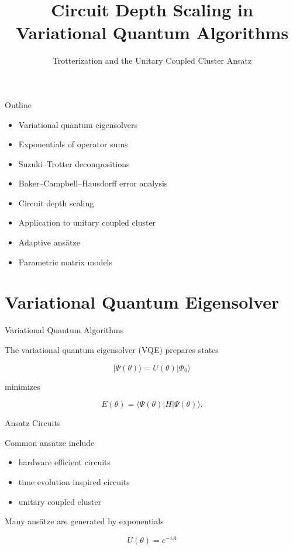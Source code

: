 \documentclass{beamer}
\title{Circuit Depth Scaling in Variational Quantum Algorithms}
\subtitle{Trotterization and the Unitary Coupled Cluster Ansatz}
\author{}
\date{}
\begin{document}
\frame{\titlepage}

\begin{frame}{Outline}

\begin{itemize}
\item Variational quantum eigensolvers
\item Exponentials of operator sums
\item Suzuki–Trotter decompositions
\item Baker–Campbell–Hausdorff error analysis
\item Circuit depth scaling
\item Application to unitary coupled cluster
\item Adaptive ansätze
\item Parametric matrix models
\end{itemize}

\end{frame}

\section{Variational Quantum Eigensolver}

\begin{frame}{Variational Quantum Algorithms}

The variational quantum eigensolver (VQE) prepares states

\[
|\Psi(\theta)\rangle = U(\theta)|\Phi_0\rangle
\]

minimizes

\[
E(\theta)=\langle\Psi(\theta)|H|\Psi(\theta)\rangle .
\]

\end{frame}

\begin{frame}{Ansatz Circuits}

  Common ansätze include

  \begin{itemize}
  \item hardware efficient circuits
  \item time evolution inspired circuits
  \item unitary coupled cluster
  \end{itemize}

  Many ansätze are generated by exponentials

  \[
  U(\theta)=e^{-iA}
  \]

\end{frame}
\end{document}
